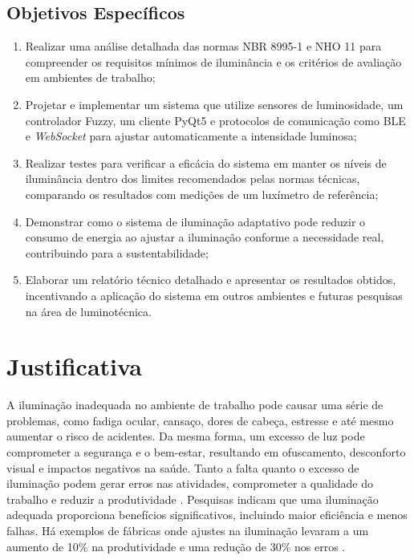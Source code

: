 % 
% 
\subsection{Objetivos Específicos}

\begin{enumerate}
    \item Realizar uma análise detalhada das normas \gls{NBR}  8995-1 e \gls{NHO} 11 para compreender os requisitos mínimos de iluminância e os critérios de avaliação em ambientes de trabalho;
    \item Projetar e implementar um sistema que utilize sensores de luminosidade, um controlador Fuzzy, um cliente \gls{PyQt5} e protocolos de comunicação como \gls{BLE} e \textit{WebSocket} para ajustar automaticamente a intensidade luminosa;
    \item Realizar testes para verificar a eficácia do sistema em manter os níveis de iluminância dentro dos limites recomendados pelas normas técnicas, comparando os resultados com medições de um luxímetro de referência;
    \item Demonstrar como o sistema de iluminação adaptativo pode reduzir o consumo de energia ao ajustar a iluminação conforme a necessidade real, contribuindo para a sustentabilidade;
    \item Elaborar um relatório técnico detalhado e apresentar os resultados obtidos, incentivando a aplicação do sistema em outros ambientes e futuras pesquisas na área de luminotécnica.
\end{enumerate}


% 
% 

\section{Justificativa}

A iluminação inadequada no ambiente de trabalho pode causar uma série de problemas, como fadiga ocular, cansaço, dores de cabeça, estresse e até mesmo aumentar o risco de acidentes. Da mesma forma, um excesso de luz pode comprometer a segurança e o bem-estar, resultando em ofuscamento, desconforto visual e impactos negativos na saúde. Tanto a falta quanto o excesso de iluminação podem gerar erros nas atividades, comprometer a qualidade do trabalho e reduzir a produtividade \cite{ILO2007}. Pesquisas indicam que uma iluminação adequada proporciona benefícios significativos, incluindo maior eficiência e menos falhas. Há exemplos de fábricas onde ajustes na iluminação levaram a um aumento de 10\% na produtividade e uma redução de 30\% nos erros \cite{ILO1998}.

